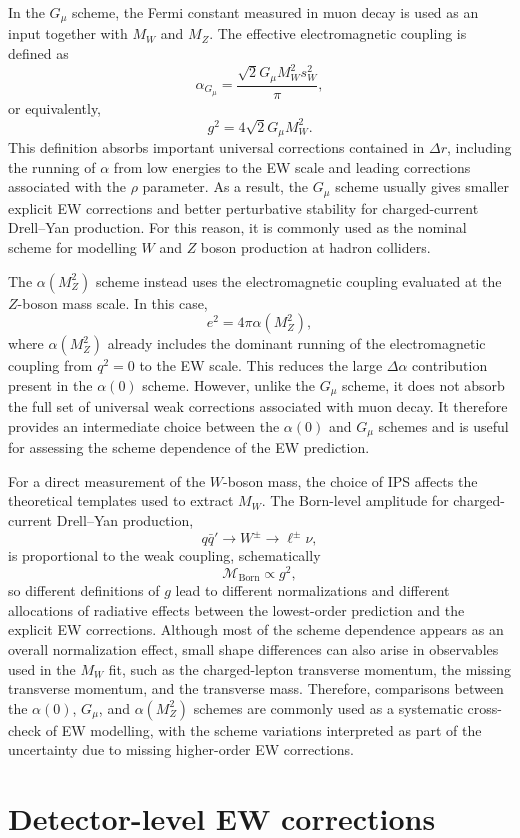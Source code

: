 In the $G_\mu$ scheme, the Fermi constant measured in muon decay is used as an input together with $M_W$ and $M_Z$. The effective electromagnetic coupling is defined as
$$
\alpha_{G_\mu}
=
\frac{\sqrt{2}G_\mu M_W^2 s_W^2}{\pi},
$$
or equivalently,
$$
g^2 = 4\sqrt{2}G_\mu M_W^2.
$$
This definition absorbs important universal corrections contained in $\Delta r$, including the running of $\alpha$ from low energies to the EW scale and leading corrections associated with the $\rho$ parameter. As a result, the $G_\mu$ scheme usually gives smaller explicit EW corrections and better perturbative stability for charged-current Drell--Yan production. For this reason, it is commonly used as the nominal scheme for modelling $W$ and $Z$ boson production at hadron colliders.

The $\alpha(M_Z^2)$ scheme instead uses the electromagnetic coupling evaluated at the $Z$-boson mass scale. In this case,
$$
e^2 = 4\pi\alpha(M_Z^2),
$$
where $\alpha(M_Z^2)$ already includes the dominant running of the electromagnetic coupling from $q^2=0$ to the EW scale. This reduces the large $\Delta\alpha$ contribution present in the $\alpha(0)$ scheme. However, unlike the $G_\mu$ scheme, it does not absorb the full set of universal weak corrections associated with muon decay. It therefore provides an intermediate choice between the $\alpha(0)$ and $G_\mu$ schemes and is useful for assessing the scheme dependence of the EW prediction.

For a direct measurement of the $W$-boson mass, the choice of IPS affects the theoretical templates used to extract $M_W$. The Born-level amplitude for charged-current Drell--Yan production,
$$
q\bar{q}' \to W^\pm \to \ell^\pm\nu,
$$
is proportional to the weak coupling, schematically
$$
\mathcal{M}_{\text{Born}} \propto g^2,
$$
so different definitions of $g$ lead to different normalizations and different allocations of radiative effects between the lowest-order prediction and the explicit EW corrections. Although most of the scheme dependence appears as an overall normalization effect, small shape differences can also arise in observables used in the $M_W$ fit, such as the charged-lepton transverse momentum, the missing transverse momentum, and the transverse mass. Therefore, comparisons between the $\alpha(0)$, $G_\mu$, and $\alpha(M_Z^2)$ schemes are commonly used as a systematic cross-check of EW modelling, with the scheme variations interpreted as part of the uncertainty due to missing higher-order EW corrections.

\section{Detector-level EW corrections}

